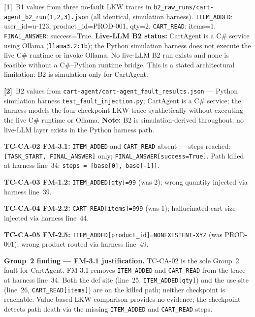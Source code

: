 \documentclass[sigconf,review,anonymous,balance=false]{acmart}
\begin{document}
\begin{table}[t]
\smallskip\par\noindent
\textbf{[1]}~B1 values from three no-fault LKW traces in
\texttt{b2\_raw\_runs/cart-agent\_b2\_run\{1,2,3\}.json}
(all identical, simulation harness).
\texttt{ITEM\_ADDED}: user\_id=u-123, product\_id=PROD-001, qty=2.
\texttt{CART\_READ}: items=1.
\texttt{FINAL\_ANSWER}: success=True.
\textbf{Live-LLM B2 status:} CartAgent is a C\# service using Ollama
(\texttt{llama3.2:1b}); the Python simulation harness does not execute
the live C\# runtime or invoke Ollama.
No live-LLM B2 run exists and none is feasible without a C\#--Python
runtime bridge.
This is a stated architectural limitation: B2 is simulation-only for CartAgent.

\smallskip\par\noindent
\textbf{[2]}~B2 values from
\texttt{cart-agent/cart-agent\_fault\_results.json}
--- Python simulation harness \texttt{test\_fault\_injection.py};
CartAgent is a C\# service; the harness models the four-checkpoint LKW
trace synthetically without executing the live C\# runtime or Ollama.
\textbf{Note:} B2 is simulation-derived throughout;
no live-LLM layer exists in the Python harness path.

\par\noindent\textbf{TC-CA-02 FM-3.1:} \texttt{ITEM\_ADDED} and
\texttt{CART\_READ} absent ---
steps reached: \texttt{[TASK\_START, FINAL\_ANSWER]} only;
\texttt{FINAL\_ANSWER[success=True]}.
Path killed at harness line~34: \texttt{steps = [base[0], base[-1]]}.
\par\noindent\textbf{TC-CA-03 FM-1.2:} \texttt{ITEM\_ADDED[qty]=99} (was 2);
wrong quantity injected via harness line~39.
\par\noindent\textbf{TC-CA-04 FM-2.2:} \texttt{CART\_READ[items]=999} (was 1);
hallucinated cart size injected via harness line~44.
\par\noindent\textbf{TC-CA-05 FM-2.5:} \texttt{ITEM\_ADDED[product\_id]=NONEXISTENT-XYZ}
(was PROD-001); wrong product routed via harness line~49.

\smallskip\par\noindent
\textbf{Group~2 finding --- FM-3.1 justification.}
TC-CA-02 is the sole Group~2 fault for CartAgent.
FM-3.1 removes \texttt{ITEM\_ADDED} and \texttt{CART\_READ} from the trace
at harness line~34.
Both the def site (line~25, \texttt{ITEM\_ADDED[qty]}) and the use site
(line~26, \texttt{CART\_READ[items]}) are on the killed path;
neither checkpoint is reachable.
Value-based LKW comparison provides no evidence;
the checkpoint detects path death via the missing \texttt{ITEM\_ADDED} and
\texttt{CART\_READ} steps.


\end{table}
\end{document}

